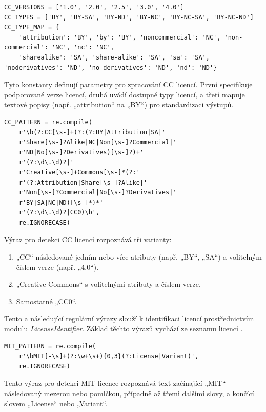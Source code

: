 \begin{lstlisting}[caption={Parametry licencí Creative Commons},label={lst:cc_parameters}]
CC_VERSIONS = ['1.0', '2.0', '2.5', '3.0', '4.0']
CC_TYPES = ['BY', 'BY-SA', 'BY-ND', 'BY-NC', 'BY-NC-SA', 'BY-NC-ND']
CC_TYPE_MAP = {
    'attribution': 'BY', 'by': 'BY', 'noncommercial': 'NC', 'non-commercial': 'NC', 'nc': 'NC',
    'sharealike': 'SA', 'share-alike': 'SA', 'sa': 'SA', 'noderivatives': 'ND', 'no-derivatives': 'ND', 'nd': 'ND'}
\end{lstlisting}
Tyto konstanty definují parametry pro zpracování CC licencí.
První specifikuje podporované verze licencí, druhá uvádí dostupné typy licencí, a třetí mapuje textové popisy (např. „attribution“ na „BY“) pro standardizaci výstupů. 

\begin{lstlisting}[caption={Regulární výraz pro Creative Commons},label={lst:cc_pattern}]
CC_PATTERN = re.compile(
    r'\b(?:CC[\s-]+(?:(?:BY|Attribution|SA|' 
    r'Share[\s-]?Alike|NC|Non[\s-]?Commercial|' 
    r'ND|No[\s-]?Derivatives)[\s-]?)+'
    r'(?:\d\.\d)?|'
    r'Creative[\s-]+Commons[\s-]*(?:'
    r'(?:Attribution|Share[\s-]?Alike|' 
    r'Non[\s-]?Commercial|No[\s-]?Derivatives|'
    r'BY|SA|NC|ND)[\s-]*)*'
    r'(?:\d\.\d)?|CC0)\b',
    re.IGNORECASE)
\end{lstlisting}
Výraz pro detekci CC licencí rozpoznává tři varianty:
\begin{enumerate}
    \item „CC“ následované jedním nebo více atributy (např. „BY“, „SA“) a volitelným číslem verze (např. „4.0“).
    \item „Creative Commons“ s volitelnými atributy a číslem verze.
    \item Samostatné „CC0“.
\end{enumerate}

Tento a následující regulární výrazy slouží k identifikaci licencí prostřednictvím modulu \textit{LicenseIdentifier}.
Základ těchto výrazů vychází ze seznamu licencí \cite{spdxSPDXLicense}.

\begin{lstlisting}[caption={Regulární výraz pro MIT License},label={lst:mit-pattern}]
MIT_PATTERN = re.compile(
    r'\bMIT[-\s]+(?:\w+\s+){0,3}(?:License|Variant)',
    re.IGNORECASE)
\end{lstlisting}
Tento výraz pro detekci MIT licence rozpoznává text začínající „MIT“ následovaný mezerou nebo pomlčkou, případně až třemi dalšími slovy, a končící slovem „License“ nebo „Variant“.


